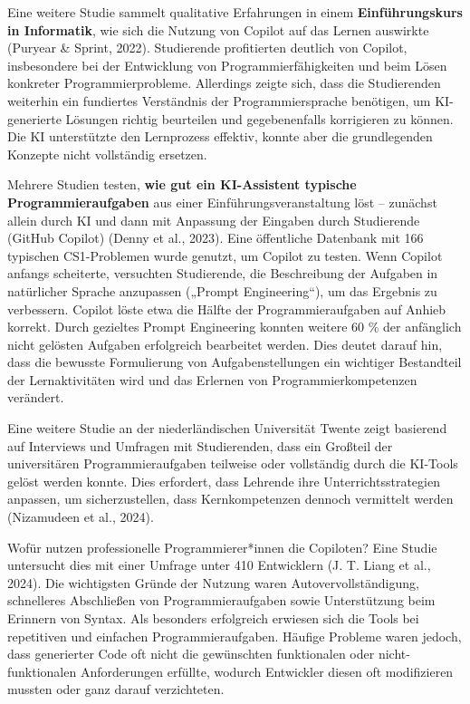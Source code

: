 \documentclass[
  ngerman,
  letterpaper,
  DIV=11]{scrreprt}
\begin{document}
Eine weitere Studie sammelt qualitative Erfahrungen in einem
\textbf{Einführungskurs in Informatik}, wie sich die Nutzung von Copilot
auf das Lernen auswirkte (Puryear \& Sprint, 2022). Studierende
profitierten deutlich von Copilot, insbesondere bei der Entwicklung von
Programmierfähigkeiten und beim Lösen konkreter Programmierprobleme.
Allerdings zeigte sich, dass die Studierenden weiterhin ein fundiertes
Verständnis der Programmiersprache benötigen, um KI-generierte Lösungen
richtig beurteilen und gegebenenfalls korrigieren zu können. Die KI
unterstützte den Lernprozess effektiv, konnte aber die grundlegenden
Konzepte nicht vollständig ersetzen.

Mehrere Studien testen, \textbf{wie gut ein KI-Assistent typische
Programmieraufgaben} aus einer Einführungsveranstaltung löst -- zunächst
allein durch KI und dann mit Anpassung der Eingaben durch Studierende
(GitHub Copilot) (Denny et al., 2023). Eine öffentliche Datenbank mit
166 typischen CS1-Problemen wurde genutzt, um Copilot zu testen. Wenn
Copilot anfangs scheiterte, versuchten Studierende, die Beschreibung der
Aufgaben in natürlicher Sprache anzupassen („Prompt Engineering``), um
das Ergebnis zu verbessern. Copilot löste etwa die Hälfte der
Programmieraufgaben auf Anhieb korrekt. Durch gezieltes Prompt
Engineering konnten weitere 60 \% der anfänglich nicht gelösten Aufgaben
erfolgreich bearbeitet werden. Dies deutet darauf hin, dass die bewusste
Formulierung von Aufgabenstellungen ein wichtiger Bestandteil der
Lernaktivitäten wird und das Erlernen von Programmierkompetenzen
verändert.

Eine weitere Studie an der niederländischen Universität Twente zeigt
basierend auf Interviews und Umfragen mit Studierenden, dass ein
Großteil der universitären Programmieraufgaben teilweise oder
vollständig durch die KI-Tools gelöst werden konnte. Dies erfordert,
dass Lehrende ihre Unterrichtsstrategien anpassen, um sicherzustellen,
dass Kernkompetenzen dennoch vermittelt werden (Nizamudeen et al.,
2024).

Wofür nutzen professionelle Programmierer*innen die Copiloten? Eine
Studie untersucht dies mit einer Umfrage unter 410 Entwicklern (J. T.
Liang et al., 2024). Die wichtigsten Gründe der Nutzung waren
Autovervollständigung, schnelleres Abschließen von Programmieraufgaben
sowie Unterstützung beim Erinnern von Syntax. Als besonders erfolgreich
erwiesen sich die Tools bei repetitiven und einfachen
Programmieraufgaben. Häufige Probleme waren jedoch, dass generierter
Code oft nicht die gewünschten funktionalen oder nicht-funktionalen
Anforderungen erfüllte, wodurch Entwickler diesen oft modifizieren
mussten oder ganz darauf verzichteten.
\end{document}

